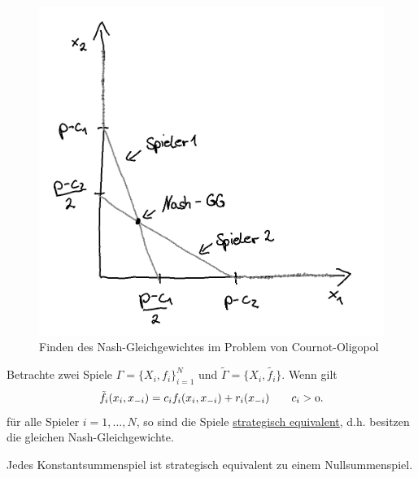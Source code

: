 \begin{beispiel}
\begin{figure}[ht!]
\begin{center}
	\includegraphics[scale=0.6]{pics/1.png}
\end{center}
\caption{Finden des Nash-Gleichgewichtes im Problem von Cournot-Oligopol}
\label{fig:CournotOligopolBsp_2}
\end{figure}
\end{beispiel}

\begin{satz}
	Betrachte zwei Spiele $\Gamma=\{X_{i}, f_{i}\}_{i=1}^{N}$ und $\tilde{\Gamma} = \{X_{i}, \tilde{f_{i}}\}$. Wenn gilt 
	\[
		\tilde{f_{i}}(x_{i},x_{-i}) = c_{i}f_{i}(x_{i}, x_{-i}) + r_{i}(x_{-i}) \qquad \mit c_{i} > 0
	.\] 
	für alle Spieler $i=1, \ldots, N$, so sind die Spiele \underline{strategisch equivalent}, d.h. besitzen die gleichen Nash-Gleichgewichte.
\end{satz}

\begin{satz}
	Jedes Konstantsummenspiel ist strategisch equivalent zu einem Nullsummenspiel.
\end{satz}

